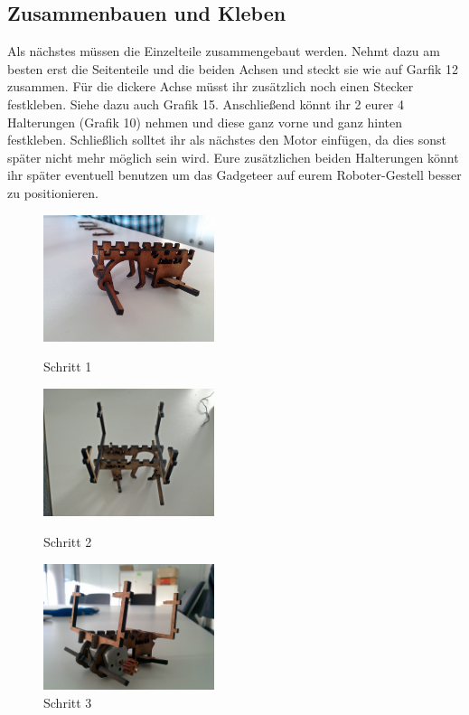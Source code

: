 \documentclass[12pt,a4paper]{article}
\begin{document}
\subsection{Zusammenbauen und Kleben}
Als nächstes müssen die Einzelteile zusammengebaut werden. Nehmt dazu am besten erst die Seitenteile und die beiden Achsen und steckt sie wie auf Garfik 12 zusammen. Für die dickere Achse müsst ihr zusätzlich noch einen Stecker festkleben. Siehe dazu auch Grafik 15.
Anschließend könnt ihr 2 eurer 4 Halterungen (Grafik 10) nehmen und diese ganz vorne und ganz hinten festkleben. Schließlich solltet ihr als nächstes den Motor einfügen, da dies sonst später nicht mehr möglich sein wird. 
Eure zusätzlichen beiden Halterungen könnt ihr später eventuell benutzen um das Gadgeteer auf eurem Roboter-Gestell besser zu positionieren.
\begin{figure}[h]
	\begin{minipage}{0.33\textwidth}
	 \includegraphics[width=5cm]{./graphics/geruest_1.jpg}
	\caption{Schritt 1}
	\end{minipage}
	\begin{minipage}{0.33\textwidth}
	 \includegraphics[width=5cm]{./graphics/geruest_2.jpg}
	\caption{Schritt 2}
	\end{minipage}
	\begin{minipage}{0.33\textwidth}
	 \includegraphics[width=5cm]{./graphics/geruest_3.jpg}
	\caption{Schritt 3}
	\end{minipage}
	
\end{figure}
\end{document}
